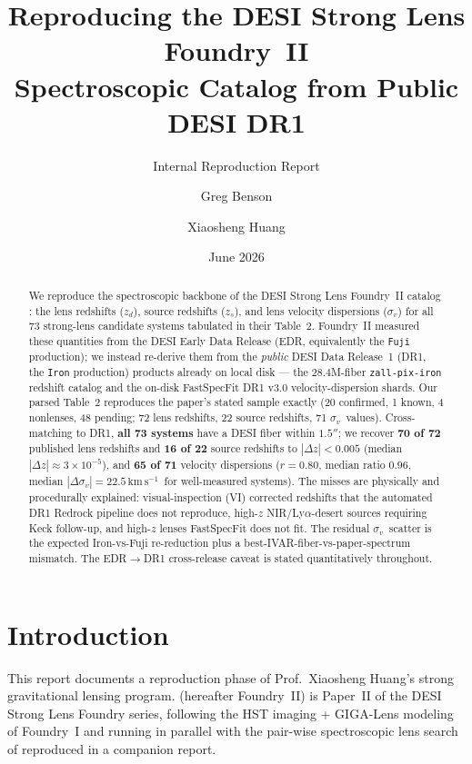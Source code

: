 \documentclass[11pt,letterpaper]{article}
\title{Reproducing the DESI Strong Lens Foundry~II\\
       Spectroscopic Catalog from Public DESI DR1}
\author{Greg Benson \and Xiaosheng Huang}
\date{June 2026}
\newcommand{\sigmav}{\ensuremath{\sigma_v}}
\newcommand{\zd}{\ensuremath{z_d}}
\newcommand{\zs}{\ensuremath{z_s}}
\newcommand{\dz}{\ensuremath{\Delta z}}
\newcommand{\kms}{\ensuremath{\mathrm{km\,s^{-1}}}}
\begin{document}
\maketitle
\subtitle{Internal Reproduction Report}

\begin{abstract}
We reproduce the spectroscopic backbone of the DESI Strong Lens Foundry~II
catalog \citep{huang2025foundry2}: the lens redshifts (\zd), source
redshifts (\zs), and lens velocity dispersions (\sigmav) for all 73 strong-lens
candidate systems tabulated in their Table~2. Foundry~II measured these
quantities from the DESI Early Data Release (EDR, equivalently the
\texttt{Fuji} production); we instead re-derive them from the
\emph{public} DESI Data Release~1 (DR1, the \texttt{Iron} production) products
already on local disk --- the $28.4$M-fiber \texttt{zall-pix-iron} redshift
catalog and the on-disk FastSpecFit DR1 v3.0 velocity-dispersion shards.
Our parsed Table~2 reproduces the paper's stated sample exactly (20 confirmed,
1 known, 4 nonlenses, 48 pending; 72 lens redshifts, 22 source redshifts, 71
\sigmav\ values). Cross-matching to DR1, \textbf{all 73 systems} have a DESI
fiber within $1.5''$; we recover \textbf{70 of 72} published lens redshifts and
\textbf{16 of 22} source redshifts to $|\dz|<0.005$ (median $|\dz|\approx
3\times10^{-5}$), and \textbf{65 of 71} velocity dispersions
($r=0.80$, median ratio $0.96$, median $|\Delta\sigmav|=22.5\,$\kms\ for
well-measured systems). The misses are physically and procedurally explained:
visual-inspection (VI) corrected redshifts that the automated DR1 Redrock
pipeline does not reproduce, high-$z$ NIR/Ly$\alpha$-desert sources requiring
Keck follow-up, and high-$z$ lenses FastSpecFit does not fit. The residual
\sigmav\ scatter is the expected Iron-vs-Fuji re-reduction plus a
best-IVAR-fiber-vs-paper-spectrum mismatch. The EDR$\to$DR1 cross-release
caveat is stated quantitatively throughout.
\end{abstract}

\tableofcontents

\bigskip

\section{Introduction}

This report documents a reproduction phase of Prof.\ Xiaosheng Huang's strong
gravitational lensing program. \citet{huang2025foundry2} (hereafter Foundry~II)
is Paper~II of the DESI Strong Lens Foundry series, following the HST imaging +
GIGA-Lens modeling of Foundry~I \citep{huang2025foundry1, gu2022gigalens} and
running in parallel with the pair-wise spectroscopic lens search of
\citet{hsu2025pairwise} reproduced in a companion report.
\end{document}
